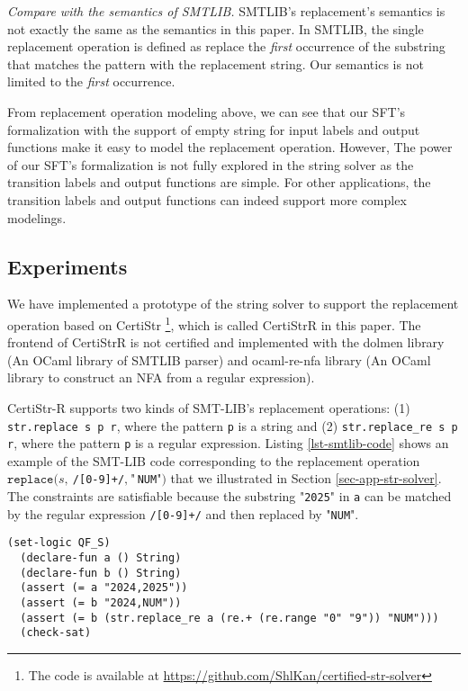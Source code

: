\documentclass[a4paper,UKenglish,cleveref, autoref, anonymous, thm-restate]{lipics-v2021}
\begin{document}
  \emph{Compare with the semantics of SMTLIB.} SMTLIB's replacement's semantics is not exactly the same as the semantics  in this paper. In SMTLIB, the single replacement operation is defined as replace the \emph{first} occurrence of the substring that matches the pattern with the replacement string. Our semantics is not limited to the \emph{first} occurrence.

  From replacement operation modeling above, we can see that our SFT's formalization with the support of empty string for input labels and output functions make it easy to model the replacement operation.
  However,
  The power of our SFT's formalization is not fully explored in the string solver as the transition labels and output functions are simple. For other applications, the transition labels and output functions can indeed support more complex modelings.


\subsection{Experiments}

We have implemented a prototype of the string solver to support the replacement operation based on CertiStr \cite{cpp/KanLRS22} \footnote{The code is available at \url{https://github.com/ShlKan/certified-str-solver}}, which is called CertiStrR in this paper.
The frontend of CertiStrR is not certified and implemented with the dolmen \cite{dolmen} library (An OCaml library of SMTLIB parser) and ocaml-re-nfa \cite{ocaml-re-nfa} library (An OCaml library to construct an NFA from a regular expression).

%
CertiStr-R supports two kinds of SMT-LIB's replacement operations: (1) \texttt{str.replace s p r}, where the pattern \texttt{p} is a string and (2) \texttt{str.replace\_re s p r}, where the pattern \texttt{p} is a regular expression. Listing \ref{lst-smtlib-code} shows an example of the SMT-LIB code corresponding to the replacement operation $\texttt{replace}(s,~$\texttt{/[0-9]+/}$,~\text{"}$\texttt{NUM}$\text{"})$ that we illustrated in Section \ref{sec-app-str-solver}. The constraints are satisfiable because the 
substring "\texttt{2025}" in \texttt{a} can be matched by the regular expression \texttt{/[0-9]+/} and then replaced by "\texttt{NUM}".


\begin{lstlisting}[language=SMTLIB, caption={Example SMT-LIB Code}, label={lst-smtlib-code}]
  (set-logic QF_S)
  (declare-fun a () String)
  (declare-fun b () String)
  (assert (= a "2024,2025"))
  (assert (= b "2024,NUM"))
  (assert (= b (str.replace_re a (re.+ (re.range "0" "9")) "NUM")))
  (check-sat)
  \end{lstlisting}
\end{document}
